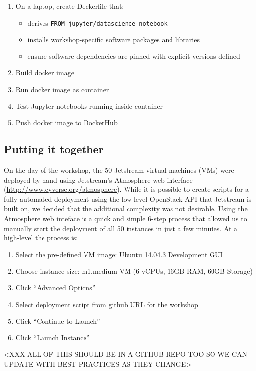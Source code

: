 \begin{enumerate}
  \item On a laptop, create Dockerfile that:
  \begin{itemize}
    \item derives \texttt{FROM jupyter/datascience-notebook}
    \item installs workshop-specific software packages and libraries
    \item ensure software dependencies are pinned with explicit versions defined
  \end{itemize}
  \item Build docker image
  \item Run docker image as container
  \item Test Jupyter notebooks running inside container
  \item Push docker image to DockerHub
\end{enumerate}


\subsection{Putting it together}

On the day of the workshop, the 50 Jetstream virtual machines (VMs) were
deployed by hand using Jetstream's Atmosphere web interface
(\url{http://www.cyverse.org/atmosphere}). While it is possible to create
scripts for a fully automated deployment using the low-level OpenStack API that
Jetstream is built on, we decided that the additional complexity was not
desirable. Using the Atmosphere web inteface is a quick and simple 6-step
process that allowed us to manually start the deployment of all 50 instances in
just a few minutes. At a high-level the process is:

\begin{enumerate}
\item Select the pre-defined VM image: Ubuntu 14.04.3 Development GUI
\item Choose instance size: m1.medium VM (6 vCPUs, 16GB RAM, 60GB
  Storage)
\item Click ``Advanced Options''
\item Select deployment script from github URL for the workshop
\item Click ``Continue to Launch''
\item Click ``Launch Instance''
\end{enumerate}

<XXX ALL OF THIS SHOULD BE IN A GITHUB REPO TOO SO WE CAN UPDATE WITH BEST PRACTICES AS THEY CHANGE>

